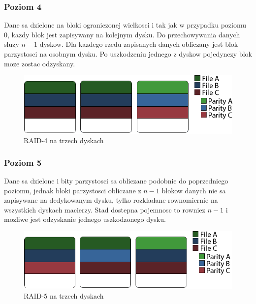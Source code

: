 \subsubsection{Poziom 4}
Dane sa dzielone na bloki ograniczonej wielkosci i tak jak w przypadku poziomu 0, kazdy blok jest zapisywany na kolejnym dysku. Do przechowywania danych sluzy $n-1$ dyskow. Dla kazdego rzedu zapisanych danych obliczany jest blok parzystosci na osobnym dysku. Po uszkodzeniu jednego z dyskow pojedynczy blok moze zostac odzyskany.
\begin{figure}[h!]
        \centering
        \includegraphics[scale=0.8]{raid-4.png}
        \caption{RAID-4 na trzech dyskach}
        \label{fig:raid4}

\end{figure}
\subsubsection{Poziom 5}
Dane sa dzielone i bity parzystosci sa obliczane podobnie do poprzedniego poziomu, jednak bloki parzystosci obliczane z $n-1$ blokow danych nie sa zapisywane na dedykowanym dysku, tylko rozkladane rownomiernie na wszystkich dyskach macierzy. Stad dostepna pojemnosc to rowniez $n-1$ i mozliwe jest odzyskanie jednego uszkodzonego dysku.
\begin{figure}[h!]
        \centering
        \includegraphics[scale=0.8]{raid-5.png}
        \caption{RAID-5 na trzech dyskach}
        \label{fig:raid5}
\end{figure}
\newpage
